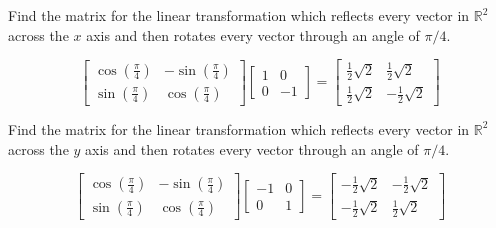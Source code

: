 \documentclass{ximera}
\begin{document}
\begin{problem}\label{prb:6.20} Find the matrix for the linear transformation which reflects every
vector in $\mathbb{R}^{2}$ across the $x$ axis and then rotates every vector
through an angle of $\pi /4$.
\begin{hint}
\[
\left[
\begin{array}{cc}
\cos \left( \frac{\pi }{4}\right)  & -\sin \left( \frac{\pi }{4}\right)  \\
\sin \left( \frac{\pi }{4}\right)  & \cos \left( \frac{\pi }{4}\right)
\end{array}
\right] \left[
\begin{array}{rr}
1 & 0 \\
0 & -1
\end{array}
\right] = \left[
\begin{array}{cc}
\frac{1}{2}\sqrt{2} & \frac{1}{2}\sqrt{2} \\
\frac{1}{2}\sqrt{2} & -\frac{1}{2}\sqrt{2}
\end{array}
\right]
\]
\end{hint}
\end{problem}

\begin{problem}\label{prb:6.21} Find the matrix for the linear transformation which reflects every
vector in $\mathbb{R}^{2}$ across the $y$ axis and then rotates every vector
through an angle of $\pi /4$.
\begin{hint}
\[
\left[
\begin{array}{cc}
\cos \left( \frac{\pi }{4}\right)  & -\sin \left( \frac{\pi }{4}\right)  \\
\sin \left( \frac{\pi }{4}\right)  & \cos \left( \frac{\pi }{4}\right)
\end{array}
\right] \left[
\begin{array}{rr}
-1 & 0 \\
0 & 1
\end{array}
\right] = \left[
\begin{array}{cc}
-\frac{1}{2}\sqrt{2} & -\frac{1}{2}\sqrt{2} \\
-\frac{1}{2}\sqrt{2} & \frac{1}{2}\sqrt{2}
\end{array}
\right]
\]
\end{hint}
\end{problem}
\end{document}
